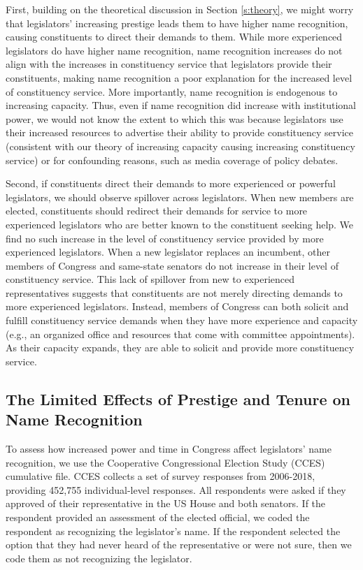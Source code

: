 \documentclass[12pt]{article}
\begin{document}
First, building on the theoretical discussion in Section \ref{s:theory}, we might worry that legislators' increasing prestige leads them to have higher name recognition, causing constituents to direct their demands to them. %
While more experienced legislators do have higher name recognition, name recognition increases do not align with the increases in constituency service that legislators provide their constituents, making name recognition a poor explanation for the increased level of constituency service. More importantly, name recognition is endogenous to increasing capacity. Thus, even if name recognition did increase with institutional power, we would not know the extent to which this was because legislators use their increased resources to advertise their ability to provide constituency service (consistent with our theory of increasing capacity causing increasing constituency service) or for confounding reasons, such as media coverage of policy debates. 

Second, if constituents direct their demands to more experienced or powerful legislators, we should observe spillover across legislators. When new members are elected, constituents should redirect their demands for service to more experienced legislators who are better known to the constituent seeking help. We find no such increase in the level of constituency service provided by more experienced legislators. When a new legislator replaces an incumbent, other members of Congress and same-state senators do not increase in their level of constituency service. This lack of spillover from new to experienced representatives suggests that constituents are not merely directing demands to more experienced legislators. Instead, members of Congress can both solicit and fulfill constituency service demands when they have more experience and capacity (e.g., an organized office and resources that come with committee appointments). As their capacity expands, they are able to solicit and provide more constituency service.  %

\subsection{The Limited Effects of Prestige and Tenure on Name Recognition}
To assess how increased power and time in Congress affect legislators' name recognition, we use the Cooperative Congressional Election Study (CCES) cumulative file. CCES collects a set of survey responses from 2006-2018, providing 452,755 individual-level responses. All respondents were asked if they approved of their representative in the US House and both senators. If the respondent provided an assessment of the elected official, we coded the respondent as recognizing the legislator's name. If the respondent selected the option that they had never heard of the representative or were not sure, then we code them as not recognizing the legislator.
\end{document}
